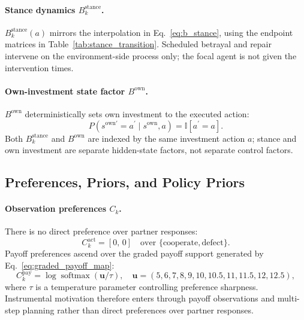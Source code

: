 \documentclass[runningheads,orivec]{llncs}
\begin{document}
\paragraph{Stance dynamics \(B_k^{\mathrm{stance}}\).}
\(B_k^{\mathrm{stance}}(a)\) mirrors the interpolation in Eq.~\eqref{eq:b_stance}, using the endpoint matrices in Table~\ref{tab:stance_transition}. Scheduled betrayal and repair intervene on the environment-side process only; the focal agent is not given the intervention times.

\paragraph{Own-investment state factor \(B^{\mathrm{own}}\).}
\(B^{\mathrm{own}}\) deterministically sets own investment to the executed action:
\begin{equation}
P(s^{\mathrm{own}\prime}=a^\prime \mid s^{\mathrm{own}}, a)=\mathbb{I}[a^\prime=a].
\label{eq:b_own}
\end{equation}
Both \(B_k^{\mathrm{stance}}\) and \(B^{\mathrm{own}}\) are indexed by the same investment action \(a\); stance and own investment are separate hidden-state factors, not separate control factors.

\subsection{Preferences, Priors, and Policy Priors}

\paragraph{Observation preferences \(C_k\).}
There is no direct preference over partner responses:
\begin{equation}
C_k^{\mathrm{act}} = [0,\,0] \quad \text{over } \{\mathrm{cooperate},\mathrm{defect}\}.
\label{eq:c_act}
\end{equation}
Payoff preferences ascend over the graded payoff support generated by Eq.~\eqref{eq:graded_payoff_map}:
\begin{equation}
C_k^{\mathrm{pay}} = \log \operatorname{softmax}\!\left(\mathbf{u}/\tau\right),
\quad \mathbf{u}=(5,6,7,8,9,10,10.5,11,11.5,12,12.5),
\label{eq:c_pay}
\end{equation}
where $\tau$ is a temperature parameter controlling preference sharpness. Instrumental motivation therefore enters through payoff observations and multi-step planning rather than direct preferences over partner responses.
\end{document}

